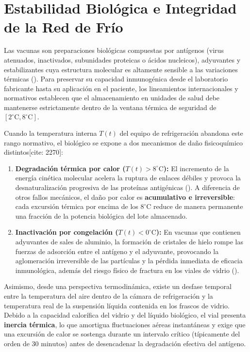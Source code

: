 \documentclass[
  spanish,
  letterpaper,
  DIV=11,
  numbers=noendperiod]{scrreprt}
\providecommand{\tightlist}{%
  \setlength{\itemsep}{0pt}\setlength{\parskip}{0pt}}
\theoremstyle{plain}
\theoremstyle{plain}
\theoremstyle{plain}
\theoremstyle{definition}
\theoremstyle{remark}
\begin{document}
\section{Estabilidad Biológica e Integridad de la Red de
Frío}\label{estabilidad-bioluxf3gica-e-integridad-de-la-red-de-fruxedo}

Las vacunas son preparaciones biológicas compuestas por antígenos (virus
atenuados, inactivados, subunidades proteicas o ácidos nucleicos),
adyuvantes y estabilizantes cuya estructura molecular es altamente
sensible a las variaciones térmicas
(). Para
preservar su capacidad inmunogénica desde el laboratorio fabricante
hasta su aplicación en el paciente, los lineamientos internacionales y
normativos establecen que el almacenamiento en unidades de salud debe
mantenerse estrictamente dentro de la ventana térmica de seguridad de
\([2^\circ\text{C}, 8^\circ\text{C}]\).

Cuando la temperatura interna \(T(t)\) del equipo de refrigeración
abandona este rango normativo, el biológico se expone a dos mecanismos
de daño fisicoquímico distintos{[}cite: 2270{]}:

\begin{enumerate}
\def\labelenumi{\arabic{enumi}.}
\tightlist
\item
  \textbf{Degradación térmica por calor (\(T(t) > 8^\circ\text{C}\)):}
  El incremento de la energía cinética molecular acelera la ruptura de
  enlaces débiles y provoca la desnaturalización progresiva de las
  proteínas antigénicas (). A diferencia de otros fallos mecánicos, el daño por
  calor es \textbf{acumulativo e irreversible}: cada excursión térmica
  por encima de los \(8^\circ\text{C}\) reduce de manera permanente una
  fracción de la potencia biológica del lote almacenado.
\item
  \textbf{Inactivación por congelación (\(T(t) < 0^\circ\text{C}\)):} En
  vacunas que contienen adyuvantes de sales de aluminio, la formación de
  cristales de hielo rompe las fuerzas de adsorción entre el antígeno y
  el adyuvante, provocando la aglomeración irreversible de las
  partículas y la pérdida inmediata de eficacia inmunológica, además del
  riesgo físico de fractura en los viales de vidrio
  ().
\end{enumerate}

Asimismo, desde una perspectiva termodinámica, existe un desfase
temporal entre la temperatura del aire dentro de la cámara de
refrigeración y la temperatura real de la suspensión líquida contenida
en los frascos de vidrio. Debido a la capacidad calorífica del vidrio y
del líquido biológico, el vial presenta \textbf{inercia térmica}, lo que
amortigua fluctuaciones aéreas instantáneas y exige que una excursión de
calor se sostenga durante un intervalo crítico (típicamente del orden de
\(30\text{ minutos}\)) antes de desencadenar la degradación efectiva del
antígeno.
\end{document}
